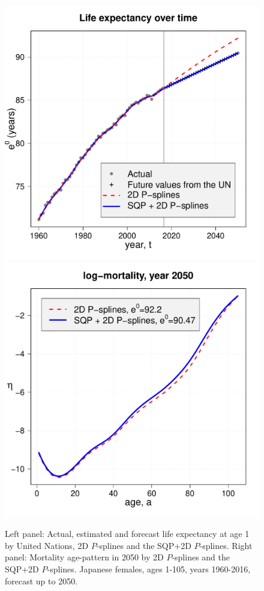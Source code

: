 \documentclass[a4paper,twoside, openright, 12pt, leqno]{article}
\begin{document}
\begin{figure}[!ht]\centering
	\includegraphics[scale=0.25]{Figures/CamardaE0.pdf}
	\includegraphics[scale=0.25]{Figures/CamardaMort2050.pdf}
	\caption{\label{fig:CamardaMort} Left panel: Actual, estimated and forecast life expectancy at age 1 by United Nations, 2D $P$-splines and the SQP+2D $P$-splines. Right panel: Mortality age-pattern in 2050 by 2D $P$-splines and the SQP+2D $P$-splines. Japanese females, ages 1-105, years 1960-2016, forecast up to 2050.}
\end{figure}
\end{document}
